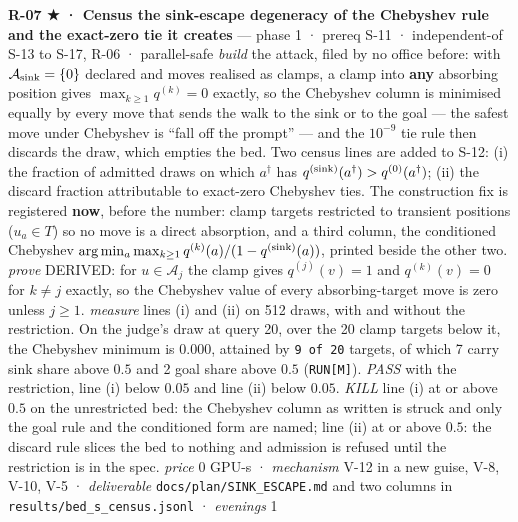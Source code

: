 \documentclass[11pt,a4paper]{article}
\theoremstyle{plain}
\theoremstyle{definition}
\theoremstyle{remark}
\begin{document}
\textbf{R-07 ★ · Census the sink-escape degeneracy of the Chebyshev rule
and the exact-zero tie it creates} --- phase 1 · prereq S-11 ·
independent-of S-13 to S-17, R-06 · parallel-safe \emph{build} the
attack, filed by no office before: with \(\mathcal{A}_{\rm sink}=\{0\}\)
declared and moves realised as clamps, a clamp into \textbf{any}
absorbing position gives \(\max_{k\ge1}q^{(k)}=0\) exactly, so the
Chebyshev column is minimised equally by every move that sends the walk
to the sink or to the goal --- the safest move under Chebyshev is ``fall
off the prompt'' --- and the \(10^{-9}\) tie rule then discards the
draw, which empties the bed. Two census lines are added to S-12: (i) the
fraction of admitted draws on which \(a^\dagger\) has
\(q^{({\rm sink})}(a^\dagger)>q^{(0)}(a^\dagger)\); (ii) the discard
fraction attributable to exact-zero Chebyshev ties. The construction fix
is registered \textbf{now}, before the number: clamp targets restricted
to transient positions (\(u_a\in T\)) so no move is a direct absorption,
and a third column, the conditioned Chebyshev
\(\arg\min_a\max_{k\ge1}q^{(k)}(a)/(1-q^{({\rm sink})}(a))\), printed
beside the other two. \emph{prove} DERIVED: for \(u\in\mathcal{A}_j\)
the clamp gives \(q^{(j)}(v)=1\) and \(q^{(k)}(v)=0\) for \(k\ne j\)
exactly, so the Chebyshev value of every absorbing-target move is zero
unless \(j\ge1\). \emph{measure} lines (i) and (ii) on 512 draws, with
and without the restriction. On the judge's draw at query 20, over the
20 clamp targets below it, the Chebyshev minimum is \(0.000\), attained
by \texttt{9\ of\ 20} targets, of which 7 carry sink share above \(0.5\)
and 2 goal share above \(0.5\) (\texttt{RUN{[}M{]}}). \emph{PASS} with
the restriction, line (i) below \(0.05\) and line (ii) below \(0.05\).
\emph{KILL} line (i) at or above \(0.5\) on the unrestricted bed: the
Chebyshev column as written is struck and only the goal rule and the
conditioned form are named; line (ii) at or above \(0.5\): the discard
rule slices the bed to nothing and admission is refused until the
restriction is in the spec. \emph{price} \(0\) GPU-s · \emph{mechanism}
V-12 in a new guise, V-8, V-10, V-5 · \emph{deliverable}
\texttt{docs/plan/SINK\_ESCAPE.md} and two columns in
\texttt{results/bed\_s\_census.jsonl} · \emph{evenings} 1
\end{document}
